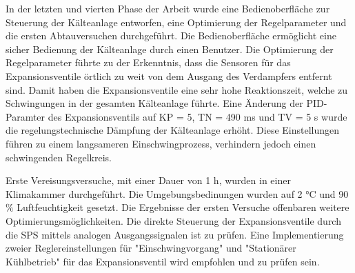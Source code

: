 In der letzten und vierten Phase der Arbeit wurde eine Bedienoberfläche zur Steuerung der Kälteanlage entworfen, eine Optimierung der Regelparameter  und die ersten Abtauversuchen durchgeführt. Die Bedienoberfläche ermöglicht eine sicher Bedienung der Kälteanlage durch einen Benutzer. Die Optimierung der Regelparameter führte zu der Erkenntnis, dass die Sensoren für das Expansionsventile örtlich zu weit von dem Ausgang des Verdampfers  entfernt sind. Damit haben die Expansionsventile eine sehr hohe Reaktionszeit, welche zu Schwingungen in der gesamten Kälteanlage führte. Eine Änderung der PID-Paramter des Expansionsventils auf KP = 5, TN = 490 ms und TV = 5 s  wurde die regelungstechnische Dämpfung der Kälteanlage erhöht. Diese Einstellungen führen zu einem langsameren Einschwingprozess, verhindern jedoch einen schwingenden Regelkreis. 

Erste Vereisungsversuche, mit einer Dauer von 1 h, wurden in einer Klimakammer durchgeführt. Die Umgebungsbedinungen wurden auf 2 °C und 90 $\%$ Luftfeuchtigkeit gesetzt.
Die Ergebnisse der ersten Versuche offenbaren weitere Optimierungsmöglichkeiten. Die direkte Steuerung der Expansionsventile durch die SPS mittels analogen Ausgangssignalen ist zu prüfen.  Eine Implementierung zweier Reglereinstellungen für  "Einschwingvorgang" und "Stationärer Kühlbetrieb" für das Expansionsventil wird empfohlen und zu prüfen sein. 

 

 